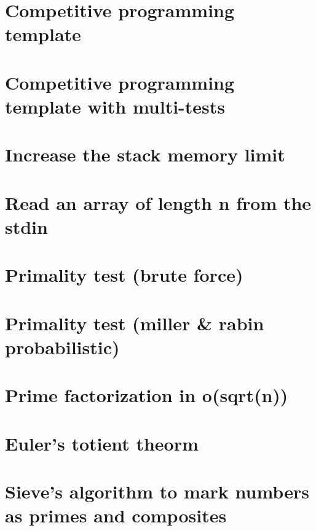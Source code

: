 \section{Competitive programming template}
\raggedbottom

\section{Competitive programming template with multi-tests}
\raggedbottom

\section{Increase the stack memory limit}
\raggedbottom

\section{Read an array of length n from the stdin}
\raggedbottom

\section{Primality test (brute force)}
\raggedbottom

\section{Primality test (miller \& rabin probabilistic)}
\raggedbottom

\section{Prime factorization in o(sqrt(n))}
\raggedbottom

\section{Euler's totient theorm}
\raggedbottom

\section{Sieve's algorithm to mark numbers as primes and composites}
\raggedbottom

